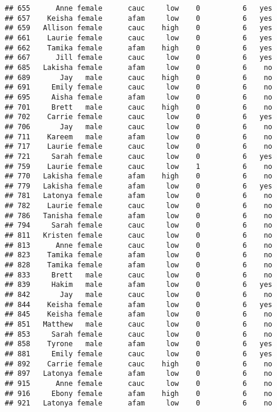 \documentclass[
]{article}
\begin{document}
\begin{verbatim}
## 655      Anne female      cauc     low    0          6   yes
## 657    Keisha female      afam     low    0          6   yes
## 659   Allison female      cauc    high    0          6   yes
## 661    Laurie female      cauc     low    0          6   yes
## 662    Tamika female      afam    high    0          6   yes
## 667      Jill female      cauc     low    0          6   yes
## 685   Lakisha female      afam     low    0          6    no
## 689       Jay   male      cauc    high    0          6    no
## 691     Emily female      cauc     low    0          6    no
## 695     Aisha female      afam     low    0          6    no
## 701     Brett   male      cauc    high    0          6    no
## 702    Carrie female      cauc     low    0          6   yes
## 706       Jay   male      cauc     low    0          6    no
## 711    Kareem   male      afam     low    0          6    no
## 717    Laurie female      cauc     low    0          6    no
## 721     Sarah female      cauc     low    0          6   yes
## 759    Laurie female      cauc     low    1          6    no
## 770   Lakisha female      afam    high    0          6    no
## 779   Lakisha female      afam     low    0          6   yes
## 781   Latonya female      afam     low    0          6    no
## 782    Laurie female      cauc     low    0          6    no
## 786   Tanisha female      afam     low    0          6    no
## 794     Sarah female      cauc     low    0          6    no
## 811   Kristen female      cauc     low    0          6    no
## 813      Anne female      cauc     low    0          6    no
## 823    Tamika female      afam     low    0          6    no
## 828    Tamika female      afam     low    0          6    no
## 833     Brett   male      cauc     low    0          6    no
## 839     Hakim   male      afam     low    0          6   yes
## 842       Jay   male      cauc     low    0          6    no
## 844    Keisha female      afam     low    0          6   yes
## 845    Keisha female      afam     low    0          6    no
## 851   Matthew   male      cauc     low    0          6    no
## 853     Sarah female      cauc     low    0          6    no
## 858    Tyrone   male      afam     low    0          6   yes
## 881     Emily female      cauc     low    0          6   yes
## 892    Carrie female      cauc    high    0          6    no
## 897   Latonya female      afam     low    0          6    no
## 915      Anne female      cauc     low    0          6    no
## 916     Ebony female      afam    high    0          6    no
## 921   Latonya female      afam     low    0          6    no

\end{verbatim}
\end{document}
